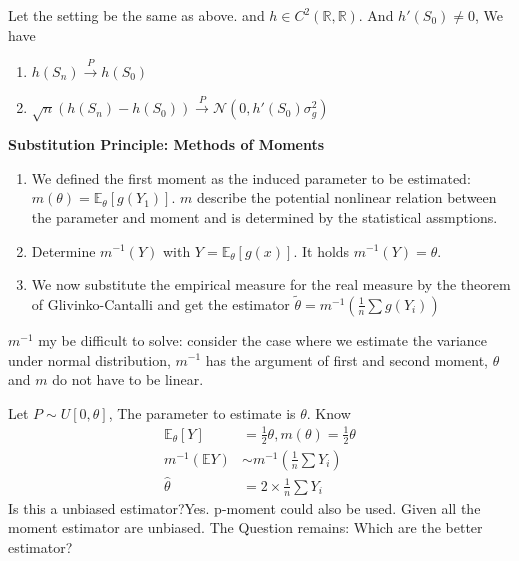 \begin{theorem}
Let the setting be the same as above. and $h \in C^2(\mathbb{R}, \mathbb{R})$. And $h'(S_0) \neq 0$, We have
\begin{enumerate}
	\item $h(S_n) \overset{P}{\longrightarrow} h(S_0)$
	\item $\sqrt{n}(h(S_n) - h(S_0)) \overset{P}{\longrightarrow} \mathcal{N}(0, h'(S_0) \sigma_g^2)$
\end{enumerate}
\end{theorem}

\textbf{Substitution Principle: Methods of Moments}

\begin{method}
\begin{enumerate}
	\item We defined the first moment as the induced parameter to be estimated: $m(\theta) = \mathbb{E}_{\theta}[g(Y_1)]$. $m$ describe the potential nonlinear relation between the parameter and moment and is determined by the statistical assmptions. 
	\item Determine $m^{-1}(Y)$ with $Y = \mathbb{E}_\theta [g(x)]$. It holds $m^{-1}(Y)  = \theta$. 
	\item We now substitute the empirical measure for the real measure by the theorem of Glivinko-Cantalli and get the estimator $\tilde{\theta} = m^{-1}(\frac{1}{n} \sum g(Y_i))$
\end{enumerate}
\end{method} 
\begin{remark}
$m^{-1}$ my be difficult to solve: consider the case where we estimate the variance under normal distribution, $m^{-1}$ has the argument of first and second moment, $\theta$ and $m$ do not have to be linear.	
\end{remark}


\begin{example}
Let $ P \sim U[0, \theta]$, The parameter to estimate is $\theta$. Know 
\begin{equation*}
	\begin{aligned}
		\mathbb{E}_\theta [Y] &= \frac{1}{2} \theta, m(\theta) = \frac{1}{2}\theta\\
		m^{-1}(\mathbb{E}Y) &\sim m^{-1}(\frac{1}{n}\sum Y_i)\\
		\hat{\theta} &= 2 \times \frac{1}{n} \sum Y_i
	\end{aligned}
\end{equation*}
Is this a unbiased estimator?Yes. p-moment could also be used. Given all the moment estimator are unbiased. The Question remains: Which are the better estimator?
\end{example}





